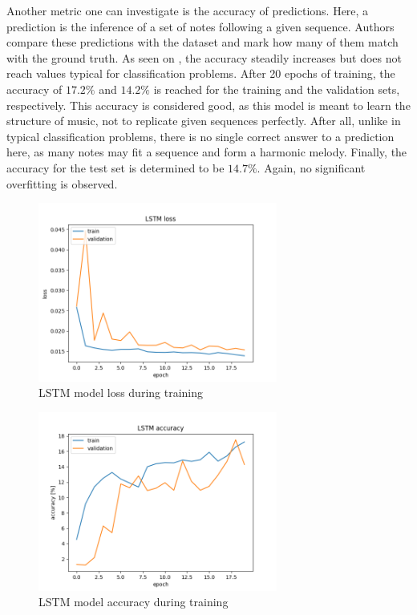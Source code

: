 \documentclass[a4paper, 11pt, twoside]{report}
\theoremstyle{definition}
\begin{document}
Another metric one can investigate is the accuracy of predictions. Here, a prediction is the inference of a set of notes following a given sequence. Authors compare these predictions with the dataset and mark how many of them match with the ground truth. As seen on , the accuracy steadily increases but does not reach values typical for classification problems. After 20 epochs of training, the accuracy of $17.2\%$ and $14.2\%$ is reached for the training and the validation sets, respectively. This accuracy is considered good, as this model is meant to learn the structure of music, not to replicate given sequences perfectly. After all, unlike in typical classification problems, there is no single correct answer to a prediction here, as many notes may fit a sequence and form a harmonic melody. Finally, the accuracy for the test set is determined to be $14.7\%$. Again, no significant overfitting is observed.

\begin{figure}[H]
    \centering
    \includegraphics[width=0.7\textwidth]{lstm_loss.png}
    \caption{LSTM model loss during training}
    \label{fig:lstm_loss}
\end{figure}

\begin{figure}[H]
    \centering
    \includegraphics[width=0.7\textwidth]{lstm_accuracy.png}
    \caption{LSTM model accuracy during training}
    \label{fig:lstm_accuracy}
\end{figure}
\end{document}

